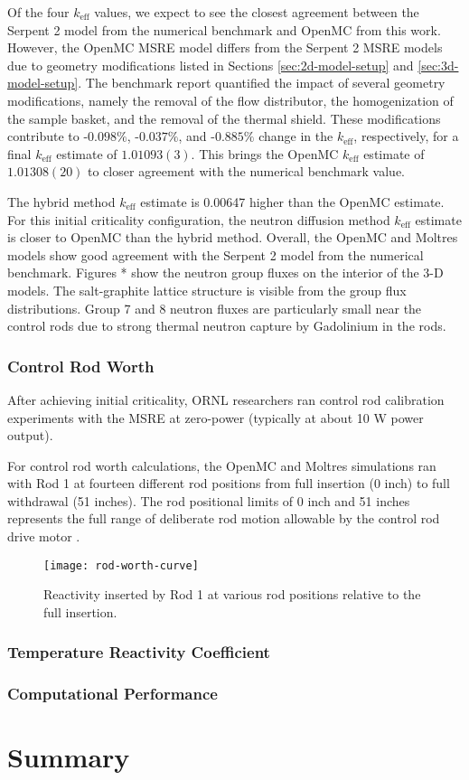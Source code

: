 Of the four $k_\text{eff}$ values, we expect to see the closest agreement between the Serpent 2
model from the numerical benchmark and OpenMC from this work. However, the OpenMC \gls{MSRE} model
differs from the Serpent 2 \gls{MSRE} models due to geometry modifications listed in Sections
\ref{sec:2d-model-setup} and \ref{sec:3d-model-setup}. The benchmark report quantified the impact
of several geometry modifications, namely the removal of the flow distributor, the homogenization
of the sample basket, and the removal of the thermal shield. These modifications contribute to
-$0.098\%$, -$0.037\%$, and -$0.885\%$ change in the $k_\text{eff}$, respectively, for a final
$k_\text{eff}$ estimate of $1.01093(3)$. This brings the OpenMC $k_\text{eff}$ estimate of
$1.01308(20)$ to closer agreement with the numerical benchmark value.

The hybrid method $k_\text{eff}$ estimate is 0.00647 higher than the OpenMC estimate. For this
initial criticality configuration, the neutron diffusion method $k_\text{eff}$ estimate is closer
to OpenMC than the hybrid method. Overall, the OpenMC and Moltres models show good agreement with
the Serpent 2 model from the numerical benchmark.
Figures * show the neutron group fluxes on the interior of the 3-D models. The salt-graphite
lattice structure is visible from the group flux distributions. Group 7 and 8 neutron fluxes are
particularly small near the control rods due to strong thermal neutron capture by Gadolinium in the
rods.

\subsubsection{Control Rod Worth}

After achieving initial criticality, \gls{ORNL} researchers ran control rod calibration experiments
with the \gls{MSRE} at zero-power (typically at about 10 W power output).

For control rod worth calculations, the OpenMC and Moltres simulations ran  with Rod 1 at fourteen
different rod positions from full insertion (0 inch) to full withdrawal (51 inches). The rod
positional limits of 0 inch and 51 inches represents the full range of deliberate rod motion
allowable by the control rod drive motor \cite{robertson_msre_1965}.

\begin{figure}[p]
  \centering
  \texttt{[image: rod-worth-curve]}
  \caption{Reactivity inserted by Rod 1 at various rod positions relative to the full insertion.}
  \label{fig:rod-worth}
\end{figure}

\subsubsection{Temperature Reactivity Coefficient}

\subsubsection{Computational Performance}

\section{Summary}

